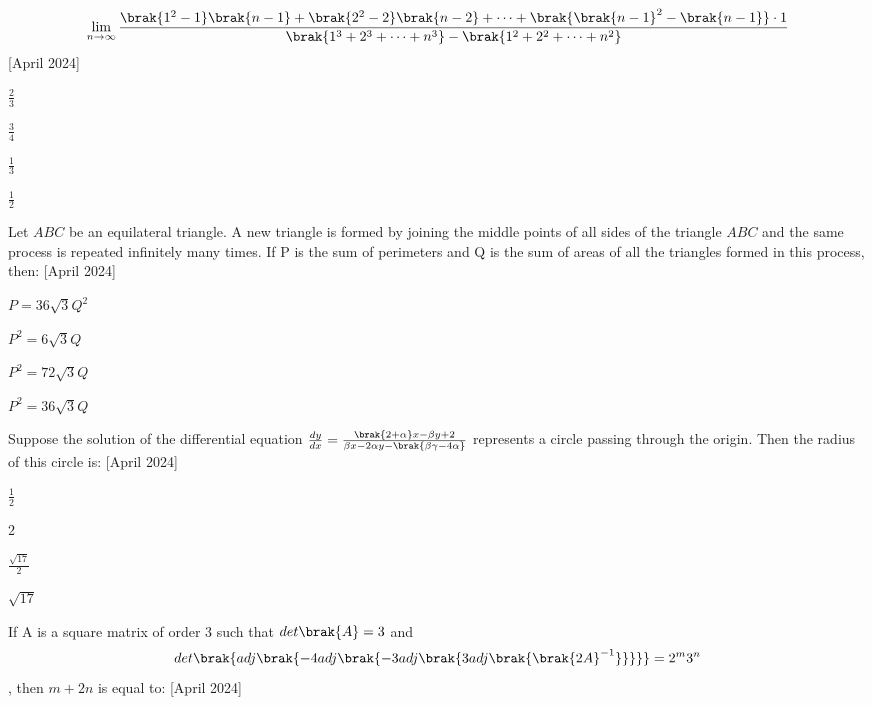 \iffalse
  \title{2024}
  \author{EE24BTECH11007}
  \section{mcq-single}
\fi
\item \[\lim_{n\to\infty}\frac{\brak{1^2 -1}\brak{n-1}+\brak{2^2 -2}\brak{n-2}+\dots+\brak{\brak{n-1}^2 -\brak{n-1}}\cdot1}{\brak{1^3 +2^3 +\dots+n^3}-\brak{1^2 +2^2 +\dots+n^2}}\] \hfill{[April 2024]}
\begin{enumerate}
\begin{multicols}{4}
\item $\frac{2}{3}$
\item $\frac{3}{4}$
\item $\frac{1}{3}$
\item $\frac{1}{2}$
\end{multicols}
\end{enumerate}
\item Let $ABC$  be an equilateral triangle. A new triangle is formed by joining the middle points of all sides of the triangle $ABC$ and the same process is repeated infinitely many times. If P is the sum of perimeters and Q is the sum of areas of all the triangles formed in this process, then: \hfill{[April 2024]}
\begin{enumerate}
\begin{multicols}{4}
\item $P=36\sqrt{3}Q^2$
\item $P^2=6\sqrt{3}Q$
\item $P^2=72\sqrt{3}Q$
\item $P^2=36\sqrt{3}Q$
\end{multicols}
\end{enumerate}
\item Suppose the solution of the differential equation $\frac{dy}{dx} = \frac{\brak{2+\alpha}x - \beta y + 2}{\beta x - 2\alpha y - \brak{\beta\gamma - 4\alpha}}$ represents a circle passing through the origin. Then the radius of this circle is: \hfill{[April 2024]}
\begin{enumerate}
\begin{multicols}{4}
\item $\frac{1}{2}$
\item $2$
\item $\frac{\sqrt{17}}{2}$
\item $\sqrt{17}$
\end{multicols}
\end{enumerate}
\item If A is a square matrix of order 3 such that $det\brak{A} = 3$ and $$det\brak{adj\brak{-4 adj\brak{-3 adj\brak{3 adj \brak{\brak{2A}^{-1}}}}}} = 2^m 3^n $$, then $m + 2n$ is equal to: \hfill{[April 2024]}
